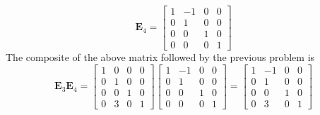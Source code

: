 \documentclass[]{article}
\begin{document}
\subsubsection{}

\begin{equation}
	\mathbf{E}_4 = \begin{bmatrix}
	1 & -1 & 0 & 0 \\
	0 & 1 & 0 & 0 \\
	0 & 0 & 1 & 0 \\
	0 & 0 & 0 & 1
	\end{bmatrix}
\end{equation}
The composite of the above matrix followed by the previous problem is 
\begin{equation}
	\mathbf{E}_3 \mathbf{E}_4 = 
	\begin{bmatrix}
	1 & 0 & 0 & 0 \\
	0 & 1 & 0 & 0 \\
	0 & 0 & 1 & 0 \\
	0 & 3 & 0 & 1
	\end{bmatrix}
	\begin{bmatrix}
	1 & -1 & 0 & 0 \\
	0 & 1 & 0 & 0 \\
	0 & 0 & 1 & 0 \\
	0 & 0 & 0 & 1
	\end{bmatrix}
	=
	\begin{bmatrix}
	1 & -1 & 0 & 0 \\
	0 & 1 & 0 & 0 \\
	0 & 0 & 1 & 0 \\
	0 & 3 & 0 & 1
	\end{bmatrix}
\end{equation}

\subsection{}
\end{document}
